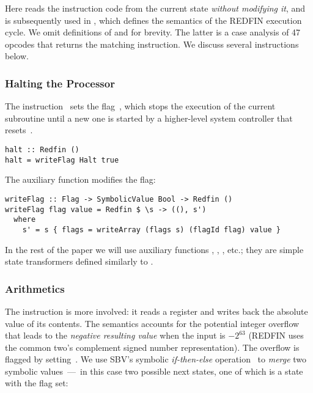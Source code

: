\noindent
Here  reads the instruction code from the current
state \emph{without modifying it}, and is subsequently used in ,
which defines the semantics of the REDFIN execution cycle. We omit definitions of
 and  for brevity. The latter is a
case analysis of 47 opcodes that returns the matching instruction. We discuss
several instructions below.

\subsubsection{Halting the Processor}
The instruction~ sets the flag~, which stops the execution of
the current subroutine until a new one is started by a higher-level system
controller that resets~.


\begin{verbatim}
halt :: Redfin ()
halt = writeFlag Halt true
\end{verbatim}


\noindent
The auxiliary function  modifies the flag:


\begin{verbatim}
writeFlag :: Flag -> SymbolicValue Bool -> Redfin ()
writeFlag flag value = Redfin $ \s -> ((), s')
  where
    s' = s { flags = writeArray (flags s) (flagId flag) value }
\end{verbatim}


\noindent
In the rest of the paper we will use auxiliary functions ,
, , etc.; they are simple state transformers
defined similarly to .

\subsubsection{Arithmetics}
The instruction  is more involved:
it reads a register and writes back the absolute value of its contents.
The semantics accounts for the potential integer overflow that leads to the
\emph{negative resulting value} when the input is $-2^{63}$ (REDFIN uses the
common two's complement signed number representation). The overflow is flagged
by setting~. We use SBV's symbolic \emph{if-then-else}
operation~ to \emph{merge} two symbolic values~---~in this case two
possible next states, one of which is a state with the  flag set:


